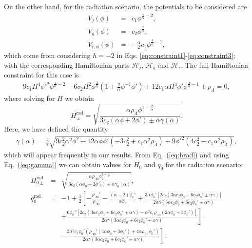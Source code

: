 \documentclass[onecolumn,superscriptaddress,secnumarabic,amssymb,amsmath,nobibnotes,aps,prd,nofootinbib,altaffilletter]{revtex4}
\newcommand{\ham}{\mathcal{H}}
\begin{document}
On the other hand, for the radiation scenario, the potentials to be considered are 
\begin{eqnarray}
    V_j(\phi) &=& c_1\phi^{\frac{4}{\alpha}-2},\\
    V_g(\phi) &=& c_2\phi^{\frac{2}{\alpha}},\\
    V_{r,\phi}(\phi) &=& -\frac{\alpha}{2}c_1\phi^{\frac{4}{\alpha}-1},
\end{eqnarray}
which come from considering $h=-2$ in Eqs. \eqref{eq:constraint1}-\eqref{eq:constraint3}; with the corresponding Hamiltonian parts $\ham_j$, $\ham_g$ and $\ham_r$. The full Hamiltonian constraint for this case is
\begin{eqnarray}
    9c_1H^4{\phi'}^2\phi^{\frac{4}{\alpha}-2}-6c_2 H^2 \phi^{\frac{2}{\alpha}}\left(1+\frac{2}{\alpha}\phi^{-1}\phi' \right) +12c_1\alpha H^4\phi'\phi^{\frac{4}{\alpha}-1}+\rho_\Lambda =0,
    \label{eq:hamradiation}
\end{eqnarray}
where solving for $H$ we obtain
\begin{equation}
    H^{\text{rad}}_{\pm}= \sqrt{\frac{\alpha \rho_{\Lambda} \phi^{1-\frac{2}{\alpha}}}{ 3c_2(\alpha\phi + 2\phi') \pm \alpha \gamma(\alpha)}}
    \label{eq:hrad}.
\end{equation}
Here, we have defined the quantity
\begin{eqnarray}
    \gamma(\alpha) =  \frac{1}{\alpha}\sqrt{9c_2^2\alpha^2\phi^2-12\alpha\phi\phi'(-3c_2^2+c_1\alpha^2\rho_\Lambda) + 9{\phi'}^2(4c_2^2-c_1\alpha^2\rho_\Lambda)},
    \label{eq:gamma}
\end{eqnarray}
which will appear frequently in our results.
From Eq.~(\ref{eq:hrad}) and using Eq.~(\ref{eq:gamma}) we can obtain values for $H_0$ and $q_0$ for the radiation scenario:
\begin{eqnarray}
H_{0\pm}^{\text{rad}}&=&\sqrt{\frac{\alpha \rho_{\Lambda 0} \phi_0^{1-\frac{2}{\alpha}}}{ 3c_2(\alpha\phi_0 + 2\phi'_0) \pm \alpha \gamma_0(\alpha)}},
    \label{eq:h0rad}\\
    q_0^{\text{rad}}&=&-1 +\frac{1}{2} \left[ -\frac{\rho_{\Lambda 0}'}{\rho_{\Lambda 0}} -\frac{(\alpha-2)\phi_0'}{\alpha\phi_0}
   +\frac{3\alpha\phi_0' [ 2c_2 (3\alpha c_2\phi_0 +6c_2\phi_0'\pm\alpha\gamma) ] %
   }{2\alpha\gamma ( 3\alpha c_2\phi_0+6c_2\phi_0' \pm \alpha\gamma )}
    \right.
    \nonumber \\ 
   && \left.
    +\frac{6\phi_0'' [ 2c_2 ( 3\alpha c_2\phi_0+6c_2\phi_0'\pm\alpha\gamma )-\alpha^2c_1\rho_{\Lambda 0} ( 2\alpha\phi_0+3\phi_0' ) ]}{2\alpha\gamma ( 3\alpha c_2\phi_0+6c_2\phi_0' \pm \alpha\gamma )} \right]. \nonumber \\
&& \left.-\frac{3\alpha^2 c_1\phi_0' ( \rho_{\Lambda 0}' (4\alpha\phi_0+3 \phi_0' )+4\alpha\rho_{\Lambda 0}\phi_0'  )}{2\alpha\gamma ( 3\alpha c_2\phi_0+6c_2\phi_0' \pm \alpha\gamma )} \right].    \label{eq:q0rad}
\end{eqnarray}
\end{document}
